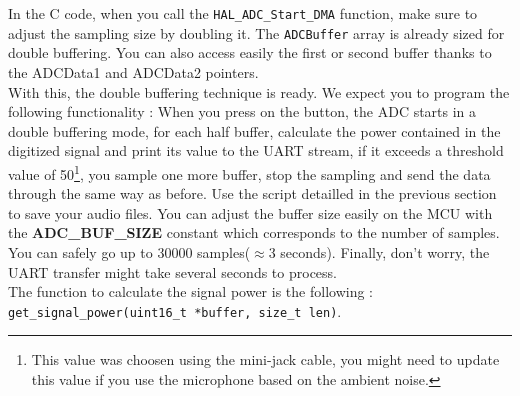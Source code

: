 
\noindent In the C code, when you call the \texttt{HAL\_ADC\_Start\_DMA} function, make sure to adjust the sampling size by doubling it. The \texttt{ADCBuffer} array is already sized for double buffering. You can also access easily the first or second buffer thanks to the ADCData1 and ADCData2 pointers.\\

\noindent With this, the double buffering technique is ready. We expect you to program the following functionality : When you press on the button, the ADC starts in a double buffering mode, for each half buffer, calculate the power contained in the digitized signal and print its value to the UART stream, if it exceeds a threshold value of 50\footnote{This value was choosen using the mini-jack cable, you might need to update this value if you use the microphone based on the ambient noise.}, you sample one more buffer, stop the sampling and send the data through the same way as before. Use the script detailled in the previous section to save your audio files. You can adjust the buffer size easily on the MCU with the \textbf{ADC\_BUF\_SIZE} constant which corresponds to the number of samples. You can safely go up to 30000 samples($\approx$3 seconds). Finally, don't worry, the UART transfer might take several seconds to process. \\

\noindent The function to calculate the signal power is the following : \texttt{get\_signal\_power(uint16\_t *buffer, size\_t len)}.



